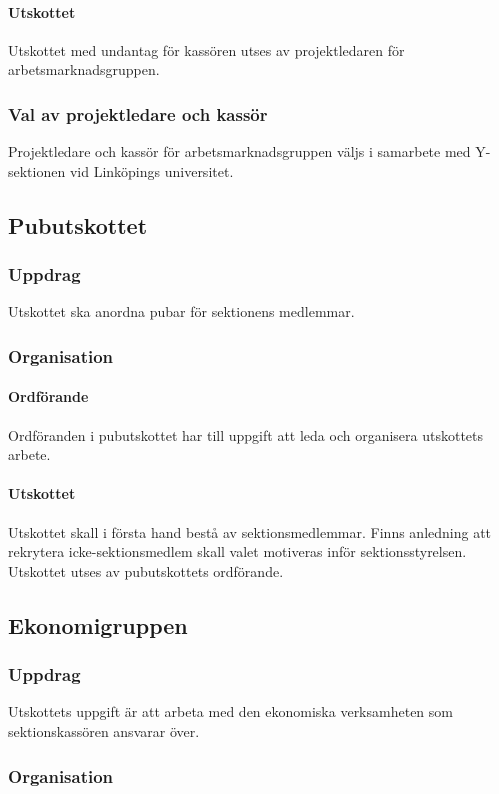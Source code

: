 \documentclass{datateknologsektionen-document}
\begin{document}
\paragraph{Utskottet}
Utskottet med undantag för kassören utses av projektledaren för arbetsmarknadsgruppen.
\subsubsection{Val av projektledare och kassör}
Projektledare och kassör för arbetsmarknadsgruppen väljs i samarbete med Y-sektionen vid
Linköpings universitet.

\subsection{Pubutskottet}
\label{pubu}
\subsubsection{Uppdrag}
Utskottet ska anordna pubar för sektionens medlemmar.
\subsubsection{Organisation}
\paragraph{Ordförande}
Ordföranden i pubutskottet har till uppgift att leda och organisera utskottets arbete.
\paragraph{Utskottet}
Utskottet skall i första hand bestå av sektionsmedlemmar. Finns anledning att rekrytera icke-sektionsmedlem skall valet motiveras inför sektionsstyrelsen. Utskottet utses av pubutskottets ordförande. 

\subsection{Ekonomigruppen}
\label{ekonomigruppen}
\subsubsection{Uppdrag}
Utskottets uppgift är att arbeta med den ekonomiska verksamheten som sektionskassören ansvarar över.
\subsubsection{Organisation}
\end{document}
